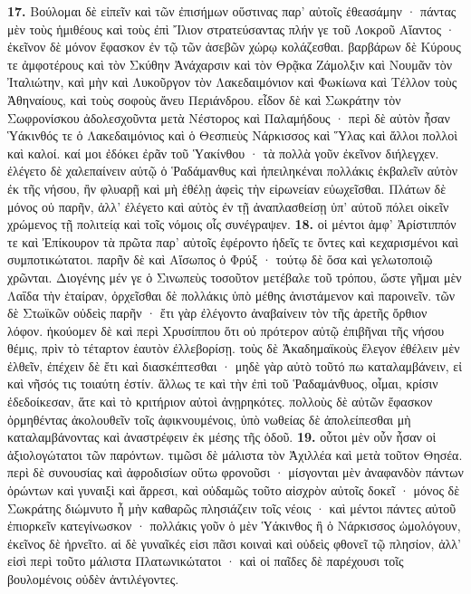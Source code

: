 \documentclass[a4paper, 11pt, oneside, polutonikogreek, german]{article}
\begin{document}
\textbf{17.} Βούλομαι δὲ εἰπεῖν καὶ τῶν ἐπισήμων οὕστινας παρ' αὐτοῖς ἐθεασάμην · πάντας μὲν τοὺς ἡμιθέους καὶ τοὺς ἐπὶ Ἴλιον στρατεύσαντας πλήν γε τοῦ Λοκροῦ Αἴαντος · ἐκεῖνον δὲ μόνον ἔφασκον ἐν τῷ τῶν ἀσεβῶν χώρῳ κολάζεσθαι. βαρβάρων δὲ Κύρους τε ἀμφοτέρους καὶ τὸν Σκύθην Ἀνάχαρσιν καὶ τὸν Θρᾷκα Ζάμολξιν καὶ Νουμᾶν τὸν Ἰταλιώτην, καὶ μὴν καὶ Λυκοῦργον τὸν Λακεδαιμόνιον καὶ Φωκίωνα καὶ Τέλλον τοὺς Ἀθηναίους, καὶ τοὺς σοφοὺς ἄνευ Περιάνδρου. εἶδον δὲ καὶ Σωκράτην τὸν Σωφρονίσκου ἀδολεσχοῦντα μετὰ Νέστορος καὶ Παλαμήδους · περὶ δὲ αὐτὸν ἦσαν Ὑάκινθός τε ὁ Λακεδαιμόνιος καὶ ὁ Θεσπιεὺς Νάρκισσος καὶ Ὕλας καὶ ἄλλοι πολλοὶ καὶ καλοί. καί μοι ἐδόκει ἐρᾶν τοῦ Ὑακίνθου · τὰ πολλὰ γοῦν ἐκεῖνον διήλεγχεν. ἐλέγετο δὲ χαλεπαίνειν αὐτῷ ὁ Ῥαδάμανθυς καὶ ἠπειληκέναι πολλάκις ἐκβαλεῖν αὐτὸν ἐκ τῆς νήσου, ἢν φλυαρῇ καὶ μὴ ἐθέλῃ ἀφεὶς τὴν εἰρωνείαν εὐωχεῖσθαι. Πλάτων δὲ μόνος οὐ παρῆν, ἀλλ' ἐλέγετο καὶ αὐτὸς ἐν τῇ ἀναπλασθείσῃ ὑπ' αὐτοῦ πόλει οἰκεῖν χρώμενος τῇ πολιτείᾳ καὶ τοῖς νόμοις οἷς συνέγραψεν. \textbf{18.} οἱ μέντοι ἀμφ' Ἀρίστιππόν τε καὶ Ἐπίκουρον τὰ πρῶτα παρ' αὐτοῖς ἐφέροντο ἡδεῖς τε ὄντες καὶ κεχαρισμένοι καὶ συμποτικώτατοι. παρῆν δὲ καὶ Αἴσωπος ὁ Φρύξ · τούτῳ δὲ ὅσα καὶ γελωτοποιῷ χρῶνται. Διογένης μέν γε ὁ Σινωπεὺς τοσοῦτον μετέβαλε τοῦ τρόπου, ὥστε γῆμαι μὲν Λαΐδα τὴν ἑταίραν, ὀρχεῖσθαι δὲ πολλάκις ὑπὸ μέθης ἀνιστάμενον καὶ παροινεῖν. τῶν δὲ Στωϊκῶν οὐδεὶς παρῆν · ἔτι γὰρ ἐλέγοντο ἀναβαίνειν τὸν τῆς ἀρετῆς ὄρθιον λόφον. ἠκούομεν δὲ καὶ περὶ Χρυσίππου ὅτι οὐ πρότερον αὐτῷ ἐπιβῆναι τῆς νήσου θέμις, πρὶν τὸ τέταρτον ἑαυτὸν ἐλλεβορίσῃ. τοὺς δὲ Ἀκαδημαϊκοὺς ἔλεγον ἐθέλειν μὲν ἐλθεῖν, ἐπέχειν δὲ ἔτι καὶ διασκέπτεσθαι · μηδὲ γὰρ αὐτὸ τοῦτό πω καταλαμβάνειν, εἰ καὶ νῆσός τις τοιαύτη ἐστίν. ἄλλως τε καὶ τὴν ἐπὶ τοῦ Ῥαδαμάνθυος, οἶμαι, κρίσιν ἐδεδοίκεσαν, ἅτε καὶ τὸ κριτήριον αὐτοὶ ἀνῃρηκότες. πολλοὺς δὲ αὐτῶν ἔφασκον ὁρμηθέντας ἀκολουθεῖν τοῖς ἀφικνουμένοις, ὑπὸ νωθείας δὲ ἀπολείπεσθαι μὴ καταλαμβάνοντας καὶ ἀναστρέφειν ἐκ μέσης τῆς ὁδοῦ. \textbf{19.} οὗτοι μὲν οὖν ἦσαν οἱ ἀξιολογώτατοι τῶν παρόντων. τιμῶσι δὲ μάλιστα τὸν Ἀχιλλέα καὶ μετὰ τοῦτον Θησέα. περὶ δὲ συνουσίας καὶ ἀφροδισίων οὕτω φρονοῦσι · μίσγονται μὲν ἀναφανδὸν πάντων ὁρώντων καὶ γυναιξὶ καὶ ἄρρεσι, καὶ οὐδαμῶς τοῦτο αἰσχρὸν αὐτοῖς δοκεῖ · μόνος δὲ Σωκράτης διώμνυτο ἦ μὴν καθαρῶς πλησιάζειν τοῖς νέοις · καὶ μέντοι πάντες αὐτοῦ ἐπιορκεῖν κατεγίνωσκον · πολλάκις γοῦν ὁ μὲν Ὑάκινθος ἢ ὁ Νάρκισσος ὡμολόγουν, ἐκεῖνος δὲ ἠρνεῖτο. αἱ δὲ γυναῖκές εἰσι πᾶσι κοιναὶ καὶ οὐδεὶς φθονεῖ τῷ πλησίον, ἀλλ' εἰσὶ περὶ τοῦτο μάλιστα Πλατωνικώτατοι · καὶ οἱ παῖδες δὲ παρέχουσι τοῖς βουλομένοις οὐδὲν ἀντιλέγοντες.
\end{document}
